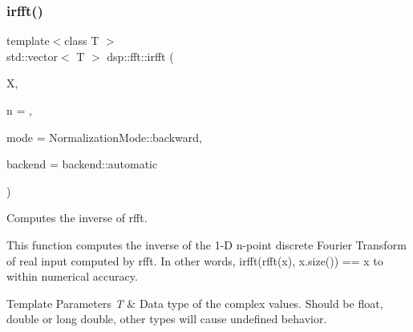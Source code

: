\subsubsection{\texorpdfstring{irfft()}{irfft()}}
{\footnotesize\ttfamily template$<$class T $>$ \\
std\+::vector$<$ T $>$ dsp\+::fft\+::irfft (\begin{DoxyParamCaption}\item[{const std\+::vector$<$ std\+::complex$<$ T $>$$>$ \&}]{X,  }\item[{unsigned}]{n = {},  }\item[{\mbox{\hyperlink{namespacedsp_1_1fft_aadeffdb34ec53320437b1c6dd1354915}{Normalization\+Mode}}}]{mode = {\ttfamily NormalizationMode\+:\+:backward},  }\item[{\mbox{\hyperlink{namespacedsp_1_1fft_a4fef2564f82f5eb8ea2d5c9909fb2ba4}{backend}}}]{backend = {\ttfamily backend\+:\+:automatic} }\end{DoxyParamCaption})}



Computes the inverse of rfft. 

This function computes the inverse of the 1-\/D n-\/point discrete Fourier Transform of real input computed by rfft. In other words, irfft(rfft(x), x.\+size()) == x to within numerical accuracy. 
\begin{DoxyTemplParams}{Template Parameters}
{\em T} & Data type of the complex values. Should be float, double or long double, other types will cause undefined behavior. \\
\hline
\end{DoxyTemplParams}

